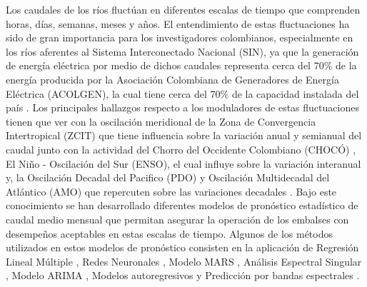 \documentclass[draft]{agujournal2019}
\begin{document}

Los caudales de los ríos fluctúan en diferentes escalas de tiempo que comprenden horas, días, semanas, meses y años. El entendimiento de estas fluctuaciones ha sido de gran importancia para los investigadores colombianos, especialmente en los ríos aferentes al Sistema Interconectado Nacional (SIN), ya que la generación de energía eléctrica por medio de dichos caudales representa cerca del 70\% de la energía producida por la Asociación Colombiana de Generadores de Energía Eléctrica (ACOLGEN), la cual tiene cerca del 70\% de la capacidad instalada del país \cite{Acolgen_2022}. Los principales hallazgos respecto a los moduladores de estas fluctuaciones tienen que ver con la oscilación meridional de la Zona de Convergencia Intertropical (ZCIT) que tiene influencia sobre la variación anual y semianual del caudal \cite{Mejia_et_al_1999} junto con la actividad del Chorro del Occidente Colombiano (CHOCÓ) \cite{Poveda_and_Mesa_2000}, El Niño - Oscilación del Sur (ENSO), el cual influye sobre la variación interanual \cite{Arias_et_al_2021,Poveda_et_al_2020,Poveda_et_al_2011} y, la Oscilación Decadal del Pacifico (PDO) y Oscilación Multidecadal del Atlántico (AMO) que repercuten sobre las variaciones decadales \cite{Poveda_2004}. Bajo este conocimiento se han desarrollado diferentes modelos de pronóstico estadístico de caudal medio mensual que permitan asegurar la operación de los embalses con desempeños aceptables en estas escalas de tiempo. Algunos de los métodos utilizados en estos modelos de pronóstico consisten en la aplicación de Regresión Lineal Múltiple \cite{Poveda_et_al_2002_predict}, Redes Neuronales \cite{Poveda_et_al_2002_predict}, Modelo MARS \cite{Poveda_et_al_2002_predict, Sanchez_and_Poveda_2006}, Análisis Espectral Singular \cite{Carvajal_et_al_1998,Rojo_and_Carvajal_2010}, Modelo ARIMA \cite{Sanchez_and_Poveda_2006}, Modelos autoregresivos \cite{Salazar_Velasquez_Mesa_Sanchez_1994} y Predicción por bandas espectrales \cite{Poveda_et_al_2002_predict}.
\end{document}
